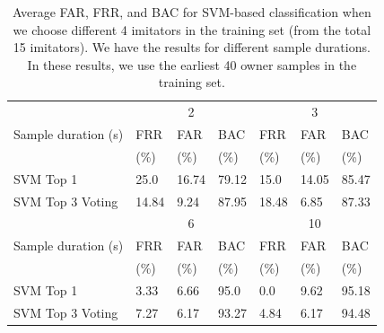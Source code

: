\begin{table}[b]
\small
\begin{tabular}{|l||l|l|l||l|l|l|}\hline
& \multicolumn{3}{|c||}{2}& \multicolumn{3}{|c|}{3}\\\cline{2-7}
Sample duration (s)& FRR & FAR & BAC & FRR & FAR & BAC\\
&(\%) &(\%) &(\%) &(\%) &(\%) &(\%)\\\hline

SVM Top 1                 & 25.0 & 16.74 &79.12 & 15.0 & 14.05 & 85.47  \\\hline
SVM Top 3 Voting          & 14.84& 9.24 & 87.95 & 18.48 & 6.85 & 87.33  \\\hline\hline

& \multicolumn{3}{|c||}{6}& \multicolumn{3}{|c|}{10}\\\cline{2-7}
Sample duration (s)& FRR & FAR & BAC & FRR & FAR & BAC\\
&(\%) &(\%) &(\%) &(\%) &(\%) &(\%)\\\hline

SVM Top 1                   & 3.33& 6.66& 95.0  & 0.0& 9.62& 95.18 \\\hline
SVM Top 3 Voting            & 7.27& 6.17& 93.27 & 4.84& 6.17& 94.48 \\\hline

\end{tabular}
\caption{Average FAR, FRR, and BAC for SVM-based classification when we choose different 4 imitators in the training set (from the total 15 imitators). We have the results for different sample durations. In these results, we use the earliest 40 owner samples in the training set.\label{tab:kfoldfalse-svm}}
\end{table}


